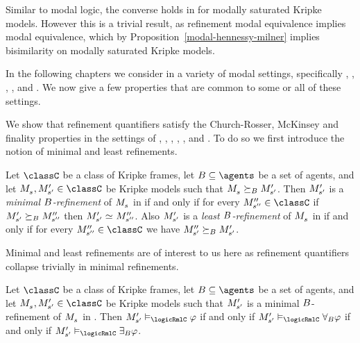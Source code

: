 Similar to modal logic, the converse holds in \logicRml{} for modally saturated Kripke models.
However this is a trivial result, as refinement modal equivalence implies modal equivalence, which by Proposition~\ref{modal-hennessy-milner} implies bisimilarity on modally saturated Kripke models.

In the following chapters we consider \logicRml{} in a variety of modal settings, specifically \classK{}, \classKF{}, \classKFF{}, \classKD{}, and \classS{}.
We now give a few properties that are common to some or all of these settings.

We show that refinement quantifiers satisfy the Church-Rosser, McKinsey and finality properties in the settings of \classK{}, \classKF{}, \classKFF{}, \classKD{}, \classSF{}, and \classS{}.
To do so we first introduce the notion of minimal and least refinements.

\begin{definition}\label{minimal-refinement}
Let $\classC$ be a class of Kripke frames, let $\agentsB \subseteq \agents$ be a set of agents, and let $\kPModel{\kStateS}, \kPModelP{\kStateSP} \in \classC$ be Kripke models such that $\kPModel{\kStateS} \simulatesBs \kPModelP{\kStateSP}$.
Then ${M^{\prime}_{{s}^{\prime}}}$ is a {\em minimal $B$-refinement} of $\kPModel{\kStateS}$ in \classC{} if and only if for every $\kPModelPP{\kStateSPP} \in \classC$ if ${M^{\prime}_{{s}^{\prime}}} \succeq_{B} {M^{\prime\prime}_{{s}^{\prime\prime}}}$ then $\kPModelP{\kStateSP} \bisimilar \kPModelPP{\kStateSPP}$.
Also ${M^{\prime}_{{s}^{\prime}}}$ is a {\em least $B$-refinement} of $\kPModel{\kStateS}$ in \classC{} if and only if for every $\kPModelPP{\kStateSPP} \in \classC$ we have ${M^{\prime\prime}_{{s}^{\prime}}} \succeq_{B} {M^{\prime}_{{s}^{\prime}}}$.
\end{definition}

Minimal and least refinements are of interest to us here as refinement quantifiers collapse trivially in minimal refinements.

\begin{proposition}\label{minimal-refinement-collapse}
Let $\classC$ be a class of Kripke frames, let $\agentsB \subseteq \agents$ be a set of agents, and let $\kPModel{\kStateS}, \kPModelP{\kStateSP} \in \classC$ be Kripke models such that ${M^{\prime}_{{s}^{\prime}}}$ is a minimal $B$-refinement of $\kPModel{\kStateS}$ in \classC{}.
Then $\kPModelP{\kStateSP} \entails_\logicRmlC \phi$ if and only if $\kPModelP{\kStateSP} \entails_\logicRmlC \allrefsBs \phi$ if and only if $\kPModelP{\kStateSP} \entails_\logicRmlC \somerefsBs \phi$.
\end{proposition}

